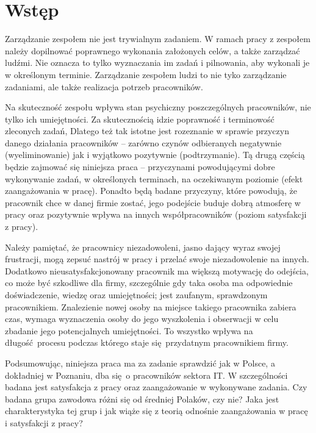 \section{Wstęp}
Zarządzanie zespołem nie jest trywialnym zadaniem. W ramach pracy z zespołem należy dopilnować poprawnego wykonania założonych celów, a także zarządzać ludźmi. Nie oznacza to tylko wyznaczania im zadań i pilnowania, aby wykonali je w określonym terminie. Zarządzanie zespołem ludzi to nie tyko zarządzanie zadaniami, ale także realizacja potrzeb pracowników.

Na skuteczność zespołu wpływa stan psychiczny poszczególnych pracowników, nie tylko ich umiejętności. Za skutecznością idzie poprawność i terminowość zleconych zadań, Dlatego też tak istotne jest rozeznanie w sprawie przyczyn danego działania pracowników -- zarówno czynów odbieranych negatywnie (wyeliminowanie) jak i wyjątkowo pozytywnie (podtrzymanie). Tą drugą częścią będzie zajmować się niniejsza praca -- przyczynami powodującymi dobre wykonywanie zadań, w określonych terminach, na
oczekiwanym poziomie (efekt zaangażowania w pracę). Ponadto będą badane przyczyny, które powodują, że pracownik chce w danej firmie zostać, jego podejście buduje dobrą atmosferę w pracy oraz pozytywnie wpływa na innych współpracowników (poziom satysfakcji z pracy). 

Należy pamiętać, że pracownicy niezadowoleni, jasno dający wyraz swojej frustracji, mogą zepsuć nastrój w pracy i przelać swoje niezadowolenie na innych. Dodatkowo nieusatysfakcjonowany pracownik ma większą motywację do odejścia, co może być szkodliwe dla firmy, szczególnie gdy taka osoba ma odpowiednie doświadczenie, wiedzę oraz umiejętności; jest zaufanym, sprawdzonym pracownikiem. Znalezienie nowej osoby na miejsce takiego pracownika zabiera czas, wymaga
wyznaczenia osoby do jego wyszkolenia i obserwacji w celu zbadanie jego
potencjalnych umiejętności. To wszystko wpływa na długość procesu podczas którego staje się przydatnym pracownikiem firmy.

Podsumowując, niniejsza praca ma za zadanie sprawdzić jak w Polsce, a dokładniej w Poznaniu, dba się o pracowników sektora IT. W szczególności badana jest satysfakcja z pracy oraz zaangażowanie w wykonywane zadania. Czy badana grupa zawodowa różni się od średniej Polaków, czy nie? Jaka jest charakterystyka tej grup i jak wiąże się z teorią odnośnie zaangażowania w pracę i satysfakcji z pracy?
